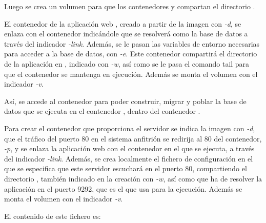 Luego se crea un volumen para que los contenedores  y  compartan el directorio .

El contenedor de la aplicación web , creado a partir de la imagen  con \textit{\--d}, se enlaza con el contenedor  indicándole que se resolverá como la base de datos a través del indicador \textit{\--link}. Además, se le pasan las variables de entorno necesarias para acceder a la base de datos, con \textit{\--e}. Este contenedor compartirá el directorio de la aplicación en , indicado con \textit{\--w}, así como se le pasa el comando tail para que el contenedor se mantenga en ejecución. Además se monta el volumen  con el indicador \textit{\--v}.

Así, se accede al contenedor  para poder construir, migrar y poblar la base de datos que se ejecuta en el contenedor , dentro del contenedor . 

Para crear el contenedor  que proporciona el servidor  se indica la imagen con \textit{\--d}, que el tráfico del puerto 80 en el sistema anfitrión se redirija al 80 del contenedor, \textit{\--p}, y se enlaza la aplicación web con el contenedor en el que se ejecuta, a través del indicador \textit{\--link}. Además, se crea localmente el fichero de configuración  en el que se especifica que este servidor escuchará en el puerto 80, compartiendo el directorio , también indicado en la creación con \textit{\--w}, así como que ha de resolver la aplicación en el puerto 9292, que es el que usa  para la ejecución. Además se monta el volumen  con el indicador \textit{\--v}.

El contenido de este fichero es: 
\begin{codelisting}
\label{code:nginxconf}
\end{codelisting}

